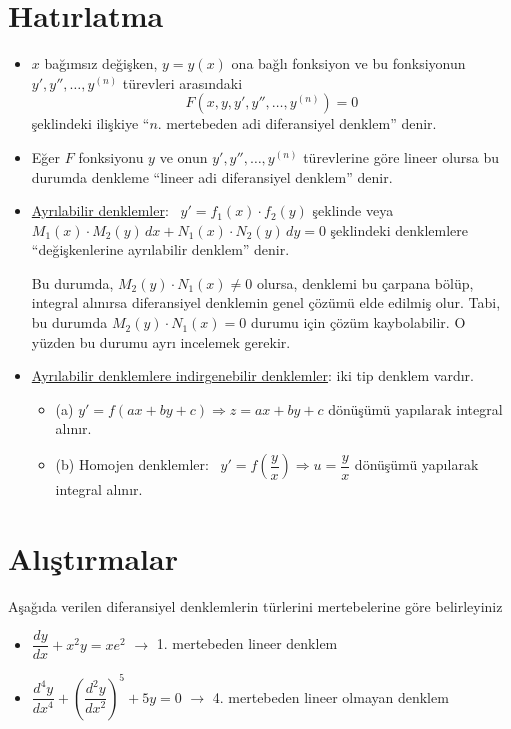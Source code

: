 \documentclass[11pt,a4paper]{article}
\begin{document}
\renewcommand\thempfootnote{\alph{mpfootnote}}%

\hfill{}
\section{Hatırlatma}
\begin{itemize}[label=\#]
\item $x$ bağımsız değişken, $y = y(x)$ ona bağlı fonksiyon ve bu fonksiyonun $y', y'', \dots, y^{(n)}$ türevleri arasındaki
\[
F\left(x, y, y', y'', \dots, y^{(n)}\right) = 0
\]
şeklindeki ilişkiye ``$n$. mertebeden adi diferansiyel denklem'' denir.
\item Eğer $F$ fonksiyonu $y$ ve onun $y', y'', \dots, y^{(n)}$ türevlerine göre lineer olursa bu durumda denkleme ``lineer adi diferansiyel denklem'' denir.
\item \underline{Ayrılabilir denklemler}: \ $y' = f_1(x)\cdot f_2(y)$ şeklinde veya
$M_1(x)\cdot M_2(y)\,dx + N_1(x)\cdot N_2(y)\,dy = 0$ şeklindeki denklemlere ``değişkenlerine ayrılabilir denklem'' denir.

Bu durumda, $M_2(y)\cdot N_1(x) \neq 0$ olursa, denklemi bu çarpana bölüp, integral alınırsa diferansiyel denklemin genel çözümü elde edilmiş olur. Tabi, bu durumda $M_2(y)\cdot N_1(x) = 0$ durumu için çözüm kaybolabilir. O yüzden bu durumu ayrı incelemek gerekir.
\item \underline{Ayrılabilir denklemlere indirgenebilir denklemler}: iki tip denklem vardır.
\begin{itemize}[label={}]
\item (a) $y' = f(ax+by+c) \Rightarrow z = ax+by+c$ dönüşümü yapılarak integral alınır.
\item (b) Homojen denklemler: \ $y' = f\!\left(\dfrac{y}{x}\right) \Rightarrow u = \dfrac{y}{x}$ dönüşümü yapılarak integral alınır.
\end{itemize}
\end{itemize}

\section{Alıştırmalar}
\begin{ornek}[1]
Aşağıda verilen diferansiyel denklemlerin türlerini mertebelerine göre belirleyiniz
\end{ornek}
\begin{itemize}[label=$\ast$]
\item $\dfrac{dy}{dx} + x^2y = xe^{2}$ \qquad $\rightarrow$ 1. mertebeden lineer denklem
\item $\dfrac{d^4y}{dx^4} + \left(\dfrac{d^2y}{dx^2}\right)^5 + 5y = 0$ \quad $\rightarrow$ 4. mertebeden lineer olmayan denklem
\end{itemize}
\end{document}
